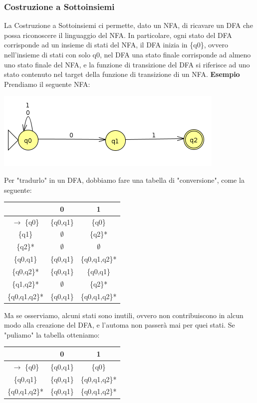 \documentclass[]{article}
\begin{document}
			\subsubsection{Costruzione a Sottoinsiemi}
				La Costruzione a Sottoinsiemi ci permette, dato un NFA, di ricavare un DFA che possa riconoscere il linguaggio del NFA. In particolare, ogni stato del DFA corrisponde ad un insieme di stati del NFA, il DFA inizia in \{q0\}, ovvero nell'insieme di stati con solo q0, nel DFA una stato finale corrisponde ad almeno uno stato finale del NFA, e la funzione di transizione del DFA si riferisce ad uno stato contenuto nel target della funzione di transizione di un NFA.\newline \newline
				\textbf{Esempio} Prendiamo il seguente NFA:
				\begin{center}
					\includegraphics{NFADFA1.png}
				\end{center}
				Per "tradurlo" in un DFA, dobbiamo fare una tabella di "conversione", come la seguente:
				\begin{center}
					\begin{tabular}{c|c|c}
						&0&1 \\
						\hline
						$\rightarrow$ \{q0\} &\{q0,q1\}&\{q0\} \\
						\{q1\} &$\emptyset$&\{q2\}* \\
						\{q2\}* &$\emptyset$&$\emptyset$ \\
						\{q0,q1\} &\{q0,q1\}&\{q0,q1,q2\}* \\
						\{q0,q2\}* &\{q0,q1\}&\{q0,q1\} \\
						\{q1,q2\}*&$\emptyset$&\{q2\}*\\
						\{q0,q1,q2\}* &\{q0,q1\}&\{q0,q1,q2\}* 
					\end{tabular}
				\end{center}
				Ma se osserviamo, alcuni stati sono inutili, ovvero non contribuiscono in alcun modo alla creazione del DFA, e l'automa non passerà mai per quei stati. Se "puliamo" la tabella otteniamo:
				\begin{center}
					\begin{tabular}{c|c|c}
						&0&1 \\
						\hline
						$\rightarrow$ \{q0\} &\{q0,q1\}&\{q0\} \\
						\{q0,q1\} &\{q0,q1\}&\{q0,q1,q2\}* \\
						\{q0,q1,q2\}* &\{q0,q1\}&\{q0,q1,q2\}* 
					\end{tabular}
				\end{center}
\end{document}

